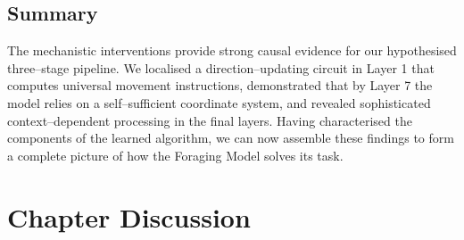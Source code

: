     





\subsection{Summary }

The mechanistic interventions provide strong causal evidence for our hypothesised three--stage pipeline. We localised a direction--updating circuit in Layer 1 that computes universal movement instructions, demonstrated that by Layer 7 the model relies on a self--sufficient coordinate system, and revealed sophisticated context--dependent processing in the final layers. Having characterised the components of the learned algorithm, we can now assemble these findings to form a complete picture of how the Foraging Model solves its task.

\section{Chapter Discussion}

